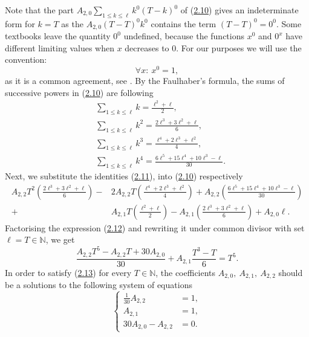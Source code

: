 \documentclass[11pt, letterpaper]{amsart} da da ya qq
\theoremstyle{definition}
\theoremstyle{remark}
\numberwithin{equation}{section}
\begin{document}
Note that the part $A_{2,0}\sum\nolimits_{1\leq k \leq \ell}k^0(T-k)^0$ of (\hyperref[alb_3_1]{2.10}) gives an indeterminate form for $k=T$ as the $A_{2,0}(T-T)^0k^0$ contains the term $(T-T)^0=0^0$. Some textbooks leave the quantity $0^0$ undefined, because the functions $x^0$ and $0^x$ have different limiting values when $x$ decreases to $0$. For our purposes we will use the convention:
$$\forall x: \ x^0 = 1,$$
as it is a common agreement, see \cite{16}.
By the Faulhaber's formula, the sums of successive powers in (\hyperref[alb_3_1]{2.10}) are following
\begin{equation}\label{alb_3_1_1}
\begin{split}
&\sum\limits_{1\leq k \leq \ell} k = \frac{\ell^2+\ell}{2}, \\
&\sum\limits_{1\leq k \leq \ell} k^2 = \frac{2\ell^3+3\ell^2+\ell}{6}, \\
&\sum\limits_{1\leq k \leq \ell} k^3 = \frac{\ell^4+2\ell^3+\ell^2}{4}, \\
&\sum\limits_{1\leq k \leq \ell} k^4 = \frac{6\ell^5+15\ell^4+10\ell^3-\ell}{30}.
\end{split}
\end{equation}
Next, we substitute the identities (\hyperref[alb_3_1_1]{2.11}), into (\hyperref[alb_3_1]{2.10}) respectively
\begin{equation}\label{alb_3_1_2}
\begin{split}
A_{2,2}T^2\left(\frac{2\ell^3+3\ell^2+\ell}{6}\right)
-&2A_{2,2}T\left(\frac{\ell^4+2\ell^3+\ell^2}{4}\right)+A_{2,2}\left(\frac{6\ell^5+15\ell^4+10\ell^3-\ell}{30}\right)\\
+&A_{2,1}T\left(\frac{\ell^2+\ell}{2}\right)-A_{2,1}\left(\frac{2\ell^3+3\ell^2+\ell}{6}\right)+A_{2,0}\ell.
\end{split}
\end{equation}
Factorising the expression (\hyperref[alb_3_1_2]{2.12}) and rewriting it under common divisor with set $\ell=T\in\mathbb{N}$, we get
\begin{equation}\label{alb_3}
\frac{A_{2,2}T^5-A_{2,2}T+30A_{2,0}}{30}+A_{2,1}\frac{T^3-T}{6}=T^5.
\end{equation}
In order to satisfy (\hyperref[alb_3]{2.13}) for every $T\in\mathbb{N}$, the coefficients $A_{2,0}, \ A_{2,1}, \ A_{2,2}$ should be a solutions to the following system of equations
\begin{equation}\label{alb_5}
\begin{cases}
\frac{1}{30}A_{2,2} &=1, \\
A_{2,1} &=1, \\
30A_{2,0}-A_{2,2}&=0.
\end{cases}
\end{equation}
\end{document}
